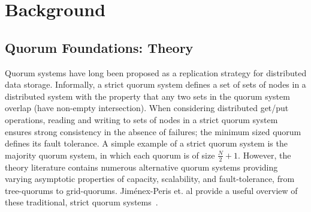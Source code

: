 \documentclass{vldb}
\begin{document}

\section{Background}

\subsection{Quorum Foundations: Theory}

Quorum systems have long been proposed as a replication strategy for
distributed data storage.  Informally, a strict quorum system defines
a set of sets of nodes in a distributed system with the property that
any two sets in the quorum system overlap (have non-empty
intersection).  When considering distributed get/put operations,
reading and writing to sets of nodes in a strict quorum system ensures
strong consistency in the absence of failures; the minimum sized
quorum defines its fault tolerance.  A simple example of a strict
quorum system is the majority quorum system, in which each quorum is
of size $\frac{N}{2}+1$.  However, the theory literature contains
numerous alternative quorum systems providing varying asymptotic
properties of capacity, scalability, and fault-tolerance, from
tree-quorums to grid-quorums.  Jim\'{e}nex-Peris et. al provide a
useful overview of these traditional, strict quorum
systems~\cite{quorums-alternative}.
\end{document}
